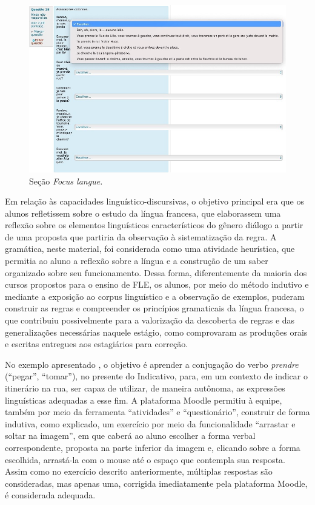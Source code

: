 \begin{figure}[htbp]
	\centering
	\begin{minipage}{0.8\textwidth}
		\includegraphics[width=\textwidth]{imagem2.png}
		\caption{Seção \textit{Focus langue.}}
		\label{fig-2}
	\end{minipage}
\end{figure}

Em relação às capacidades linguístico-discursivas, o objetivo principal
era que os alunos refletissem sobre o estudo da língua francesa, que
elaborassem uma reflexão sobre os elementos linguísticos característicos
do gênero diálogo a partir de uma proposta que partiria da observação à
sistematização da regra. A gramática, neste material, foi considerada
como uma atividade heurística, que permitia ao aluno a reflexão sobre a
língua e a construção de um saber organizado sobre seu funcionamento.
Dessa forma, diferentemente da maioria dos cursos propostos para o
ensino de FLE, os alunos, por meio do método indutivo e mediante a
exposição ao corpus linguístico e a observação de exemplos, puderam
construir as regras e compreender os princípios gramaticais da língua
francesa, o que contribuiu possivelmente para a valorização da
descoberta de regras e das generalizações necessárias naquele estágio,
como comprovaram as produções orais e escritas entregues aos estagiários
para correção.

No exemplo apresentado , o objetivo é aprender a conjugação do
verbo \emph{prendre} (\enquote{pegar}, \enquote{tomar}), no presente do Indicativo, para, em um contexto de indicar o itinerário na rua, ser capaz de
utilizar, de maneira autônoma, as expressões linguísticas adequadas a
esse fim. A plataforma Moodle permitiu à equipe, também por meio da
ferramenta \enquote{atividades} e \enquote{questionário}, construir de forma
indutiva, como explicado, um exercício por meio da funcionalidade
\enquote{arrastar e soltar na imagem}, em que caberá ao aluno escolher a forma
verbal correspondente, proposta na parte inferior da imagem e, clicando
sobre a forma escolhida, arrastá-la com o mouse até o espaço que
contempla sua resposta. Assim como no exercício descrito anteriormente,
múltiplas respostas são consideradas, mas apenas uma, corrigida
imediatamente pela plataforma Moodle, é considerada adequada.

